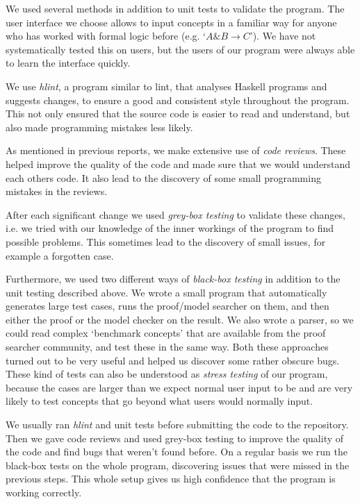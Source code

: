 We used several methods in addition to unit tests to validate the program.
The user interface we choose allows to input concepts in a familiar way for anyone
who has worked with formal logic before (e.g. `$A \& B \rightarrow C$'). We have not systematically
tested this on users, but the users of our program were always able to learn the interface quickly.

We use \emph{hlint}, a program similar to lint, that analyses Haskell programs and
suggests changes, to ensure a good and consistent style throughout the program. This
not only ensured that the source code is easier to read and understand, but also
made programming mistakes less likely.

As mentioned in previous reports, we make extensive use of \emph{code reviews}. These
helped improve the quality of the code and made sure that we would understand
each others code. It also lead to the discovery of some small programming mistakes
in the reviews.

After each significant change we used \emph{grey-box testing} to validate these
changes, i.e. we tried with our knowledge of the inner workings of the program
to find possible problems. This sometimes lead to the discovery of small issues,
for example a forgotten case.

Furthermore, we used two different ways of \emph{black-box testing} in addition to
the unit testing described above. We wrote a small program that automatically generates
large test cases, runs the proof/model searcher on them, and then either the proof
or the model checker on the result. We also wrote a parser, so we could read complex
`benchmark concepts' that are available from the proof searcher community, and
test these in the same way. Both these approaches turned out to be very
useful and helped us discover some rather obscure bugs.
These kind of tests can also be understood as \emph{stress testing} of our
program, because the cases are larger than we expect normal user input to be
and are very likely to test concepts that go beyond what users would normally
input.

We usually ran \emph{hlint} and unit tests before submitting the code to the
repository. Then we gave code reviews and used grey-box testing to improve
the quality of the code and find bugs that weren't found before. On a regular
basis we run the black-box tests on the whole program, discovering issues
that were missed in the previous steps. This whole setup gives us high
confidence that the program is working correctly.